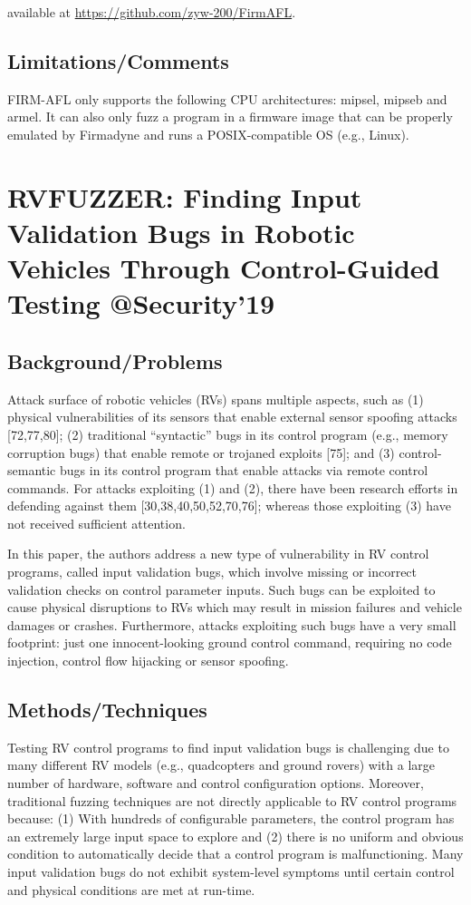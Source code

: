 available at \url{https://github.com/zyw-200/FirmAFL}.

\subsection{Limitations/Comments}
FIRM-AFL only supports the following CPU architectures: mipsel, mipseb and armel.  It can also only fuzz a program in a firmware image that can be properly emulated by Firmadyne and runs a POSIX-compatible OS (e.g., Linux).
\clearpage

\section{RVFUZZER: Finding Input Validation Bugs in Robotic Vehicles Through
Control-Guided Testing @Security'19}
\subsection{Background/Problems}
Attack surface of robotic vehicles (RVs) spans multiple aspects, such as (1) physical vulnerabilities of its sensors that enable external sensor spoofing attacks [72,77,80]; (2) traditional “syntactic” bugs in its control program (e.g., memory corruption bugs) that enable remote or trojaned exploits [75]; and (3) control-semantic bugs in its control program that enable attacks via remote control commands.  For attacks exploiting (1) and (2), there have been research efforts in defending against them [30,38,40,50,52,70,76]; whereas those exploiting (3) have not received sufficient attention. 

 In this paper, the authors address a new type of vulnerability in RV control programs, called input validation bugs, which involve missing or incorrect validation checks on control parameter inputs. Such bugs can be exploited to cause physical disruptions to RVs which may result in mission failures and vehicle damages or crashes. Furthermore, attacks exploiting such bugs have a very small footprint: just one innocent-looking ground control command, requiring no code injection, control flow hijacking or sensor spoofing. 
\subsection{Methods/Techniques}
Testing RV control programs to find input validation bugs is challenging due to many different RV models (e.g., quadcopters and ground rovers) with a large number of hardware, software and control configuration options. Moreover, traditional fuzzing techniques are not directly applicable to RV control programs because: (1) With hundreds of configurable parameters, the control program has an extremely large input space to explore and (2) there is no uniform and obvious condition to automatically decide that a control program is malfunctioning. Many input validation bugs do not exhibit system-level symptoms until certain control and physical conditions are met at run-time.


